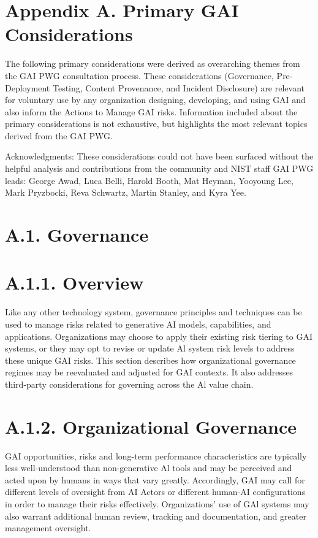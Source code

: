 \documentclass[10pt]{article}
\begin{document}
\section*{Appendix A. Primary GAI Considerations}
The following primary considerations were derived as overarching themes from the GAI PWG consultation process. These considerations (Governance, Pre-Deployment Testing, Content Provenance, and Incident Disclosure) are relevant for voluntary use by any organization designing, developing, and using GAI and also inform the Actions to Manage GAI risks. Information included about the primary considerations is not exhaustive, but highlights the most relevant topics derived from the GAI PWG.

Acknowledgments: These considerations could not have been surfaced without the helpful analysis and contributions from the community and NIST staff GAI PWG leads: George Awad, Luca Belli, Harold Booth, Mat Heyman, Yooyoung Lee, Mark Pryzbocki, Reva Schwartz, Martin Stanley, and Kyra Yee.
\section*{A.1. Governance}
\section*{A.1.1. Overview}
Like any other technology system, governance principles and techniques can be used to manage risks related to generative AI models, capabilities, and applications. Organizations may choose to apply their existing risk tiering to GAI systems, or they may opt to revise or update Al system risk levels to address these unique GAI risks. This section describes how organizational governance regimes may be reevaluated and adjusted for GAI contexts. It also addresses third-party considerations for governing across the Al value chain.
\section*{A.1.2. Organizational Governance}
GAI opportunities, risks and long-term performance characteristics are typically less well-understood than non-generative Al tools and may be perceived and acted upon by humans in ways that vary greatly. Accordingly, GAI may call for different levels of oversight from AI Actors or different human-AI configurations in order to manage their risks effectively. Organizations' use of GAl systems may also warrant additional human review, tracking and documentation, and greater management oversight.
\end{document}
